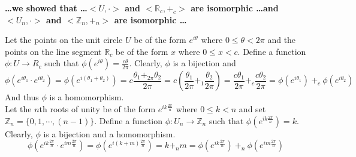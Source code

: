 \documentclass[a4paper,12pt,openany]{book}
\begin{document}
\textbf{\phantom{}}
\textbf{\dots we showed that \dots $<\!U,\cdot\!>$ and $<\!\mathbb{R}_c,+_c\!>$ are isomorphic \dots and $<\!U_n,\cdot\!>$ and $<\!\mathbb{Z}_n,+_n\!>$ are isomorphic \dots}\\
\begin{story}
	Let the points on the unit circle $U$ be of the form $e^{i\theta}$ where $0 \le \theta < 2\pi$
	and the points on the line segment $\mathbb{R}_c$ be of the form $x$ where $0 \le x < c$.
	Define a function $\phi : U \to R_c$ such that $\phi(e^{i\theta}) = \frac{c\theta}{2\pi}$. Clearly, $\phi$ is a bijection and
	$$\phi(e^{i\theta_1}\cdot e^{i\theta_2}) = \phi(e^{i(\theta_1+\theta_2)}) = c \frac{\theta_1 +_{2\pi} \theta_2}{2\pi} = c (\frac{\theta_1}{2\pi} +_1 \frac{\theta_2}{2\pi}) = \frac{c\theta_1}{2\pi} +_c \frac{c\theta_2}{2\pi} = \phi(e^{i\theta_1})\ +_c\ \phi(e^{i\theta_2})$$
	And thus $\phi$ is a homomorphism.\\


	Let the $n$th roots of unity be of the form $e^{ik\frac{2\pi}{n}}$ where $0 \le k < n$
	and set $\mathbb{Z}_n = \{ 0,1,\cdots,(n-1) \}$.
	Define a function $\phi : U_n \to \mathbb{Z}_n$ such that $\phi(e^{ik\frac{2\pi}{n}}) = k$.
	Clearly, $\phi$ is a bijection and a homomorphism.
	$$\phi(e^{ik\frac{2\pi}{n}}\cdot e^{im\frac{2\pi}{n}}) = \phi(e^{i(k+m)\frac{2\pi}{n}}) = k +_n m = \phi(e^{ik\frac{2\pi}{n}})\ +_n\ \phi(e^{im\frac{2\pi}{n}})$$
\end{story}
\end{document}
